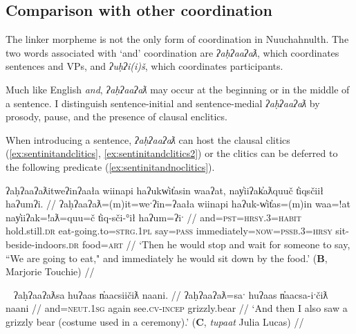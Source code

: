 \subsection{Comparison with other coordination} \label{ch:link:others}

The linker morpheme is not the only form of coordination in Nuuchahnulth. The two words associated with `and' coordination are \textit{ʔaḥʔaaʔaƛ}, which coordinates sentences and VPs, and \textit{ʔuḥʔi(i)š}, which coordinates participants.  %

Much like English \textit{and}, \textit{ʔaḥʔaaʔaƛ} may occur at the beginning or in the middle of a sentence. I distinguish sentence-initial and sentence-medial \textit{ʔaḥʔaaʔaƛ} by prosody, pause, and the presence of clausal enclitics.

When introducing a sentence, \textit{ʔaḥʔaaʔaƛ} can host the clausal clitics (\ref{ex:sentinitandclitics}, \ref{ex:sentinitandclitics2}) or the clitics can be deferred to the following predicate (\ref{ex:sentinitandnoclitics}).

\begin{comment}
Context for (): Describing a picture-story.

ʔaanamtqač̓a ʔuusuqtack̓in.
And then he got hurt a little bit.

ʔaḥʔaaʔaƛƛa ƛakišiʔeƛƛa.
And then he stands back up.
BM
\end{comment}

\ex \label{ex:sentinitandclitics}
\begingl
\glpreamble ʔaḥʔaaʔaƛitweʔinʔaała wiinapi haʔukw̓it̓asin waaʔat, nay̓iiʔak̓aƛquuč t̓iqsčiił haʔumʔi. //
\gla ʔaḥʔaaʔaƛ=(m)it=weˑʔin=ʔaała wiinapi haʔuk-w̓it̓as=(m)in waa=!at nay̓iiʔak=!aƛ=quu=č t̓iq-sči-°ił haʔum=ʔiˑ //
\glb and=\textsc{pst}=\textsc{hrsy.3}=\textsc{habit} hold.still.\textsc{dr} eat-going.to=\textsc{strg.1pl} say=\textsc{pass} immediately=\textsc{now}=\textsc{pssb.3}=\textsc{hrsy} sit-beside-indoors.\textsc{dr} food=\textsc{art} //
\glft `Then he would stop and wait for someone to say, ``We are going to eat," and immediately he would sit down by the food.' (\textbf{B}, Marjorie Touchie) //
\endgl
\xe


\ex~ \label{ex:sentinitandclitics2}
\begingl
\glpreamble ʔaḥʔaaʔaƛsa huʔaas n̓aacsiičiƛ naani. //
\gla ʔaḥʔaaʔaƛ=saˑ huʔaas n̓aacsa-iˑčiƛ naani //
\glb and=\textsc{neut.1sg} again see.\textsc{cv}-\textsc{incep} grizzly.bear  //
\glft `And then I also saw a grizzly bear (costume used in a ceremony).' (\textbf{C}, \textit{tupaat} Julia Lucas) //
\endgl
\xe

